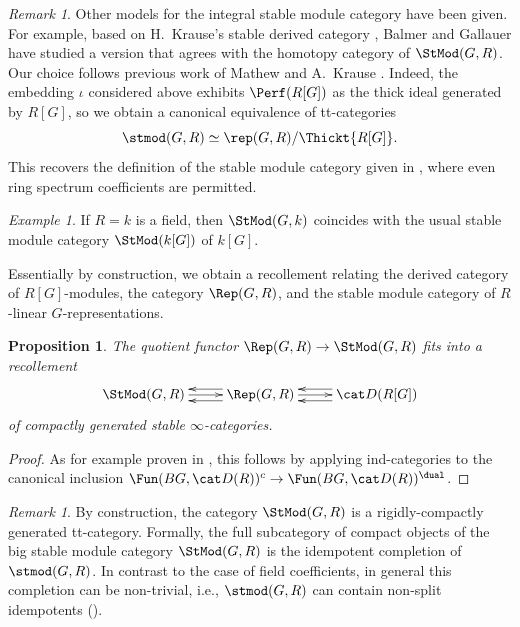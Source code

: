 \documentclass{amsart}%
\numberwithin{equation}{section}%
\newtheorem{Prop}[equation]{Proposition}
\theoremstyle{remark}
\newtheorem{Exa}[equation]{Example}
\newtheorem{Rem}[equation]{Remark}
\begin{document}
\begin{Rem}\label{rem:stmodcomparison}
Other models for the integral stable module category have been given. For example, based on H.~Krause's stable derived category \cite{krause_stablederived}, Balmer and Gallauer \cite{balmergallauer_permutationmodulescohomsing} have studied a version that agrees with the homotopy category of $\StMod(G,R)$. Our choice follows previous work of Mathew \cite{treumannmathew_reps,mathew_torus} and A.~Krause \cite{krause_picard}. Indeed, the embedding $\iota$ considered above exhibits $\Perf(R[G])$ as the thick ideal generated by $R[G]$, so we obtain a canonical equivalence of tt-categories
\[
\stmod(G,R) \simeq \rep(G,R)/\Thickt{R[G]}.
\]
This recovers the definition of the stable module category given in \cite{krause_picard}, where even ring spectrum coefficients are permitted.
\end{Rem}

\begin{Exa}
If $R=k$ is a field, then $\StMod(G,k)$ coincides with the usual stable module category $\StMod(k[G])$ of $k[G]$.
\end{Exa}

Essentially by construction, we obtain a recollement relating the derived category of $R[G]$-modules, the category $\Rep(G,R)$, and the stable module category of $R$-linear $G$-representations.

\begin{Prop}\label{prop:mainrecollement}
The quotient functor $\Rep(G,R) \to \StMod(G,R)$ fits into a recollement
\[
\xymatrix{\StMod(G,R) \ar[r] & \Rep(G,R) \ar[r] \ar@<1ex>[l] \ar@<-1ex>[l] & \cat D(R[G]) \ar@<1ex>[l] \ar@<-1ex>[l]}
\]
of compactly generated stable $\infty$-categories.
\end{Prop}
\begin{proof}
As for example proven in \cite[Prop.~2.2]{bhv2}, this follows by applying ind-categories to the canonical inclusion $\Fun(BG,\cat D(R))^c \to \Fun(BG,\cat D(R))^{\dual}$.
\end{proof}

\begin{Rem}\label{rem:stmodnatural}
By construction, the category $\StMod(G,R)$ is a rigidly-compactly generated tt-category. Formally, the full subcategory of compact objects of the big stable module category $\StMod(G,R)$ is the idempotent completion of $\stmod(G,R)$. In contrast to the case of field coefficients, in general this completion can be non-trivial, i.e., $\stmod(G,R)$ can contain non-split idempotents (\cite[Rem.~4.3]{krause_picard}).
\end{Rem}
\end{document}
